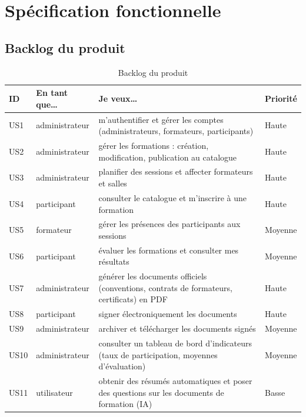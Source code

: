 \documentclass[12pt,a4paper]{report}
\begin{document}
\section{Spécification fonctionnelle}
\subsection{Backlog du produit}
\begin{table}[H]
\small
\begin{tabularx}{\textwidth}{C{1cm} C{2.2cm} X C{1.8cm}}
\toprule
\textbf{ID} & \textbf{En tant que\dots} & \textbf{Je veux\dots} & \textbf{Priorité} \\
\midrule
US1 & administrateur & m'authentifier et gérer les comptes (administrateurs, formateurs, participants) & Haute \\
US2 & administrateur & gérer les formations : création, modification, publication au catalogue & Haute \\
US3 & administrateur & planifier des sessions et affecter formateurs et salles & Haute \\
US4 & participant & consulter le catalogue et m'inscrire à une formation & Haute \\
US5 & formateur & gérer les présences des participants aux sessions & Moyenne \\
US6 & participant & évaluer les formations et consulter mes résultats & Moyenne \\
US7 & administrateur & générer les documents officiels (conventions, contrats de formateurs, certificats) en PDF & Haute \\
US8 & participant & signer électroniquement les documents & Haute \\
US9 & administrateur & archiver et télécharger les documents signés & Moyenne \\
US10 & administrateur & consulter un tableau de bord d'indicateurs (taux de participation, moyennes d'évaluation) & Moyenne \\
US11 & utilisateur & obtenir des résumés automatiques et poser des questions sur les documents de formation (IA) & Basse \\
\bottomrule
\end{tabularx}
\caption{Backlog du produit}
\end{table}
\end{document}
